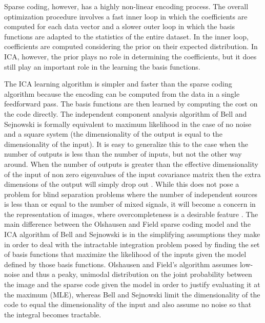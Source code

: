 Sparse coding, however, has a highly non-linear encoding process. The overall optimization procedure involves a fast inner loop in which the coefficients are computed for each data vector and a slower outer loop in which the basis functions are adapted to the statistics of the entire dataset. In the inner loop, coefficients are computed considering the prior on their expected distribution. In ICA, however, the prior plays no role in determining the coefficients, but it does still play an important role in the learning the basis functions.

The ICA learning algorithm is simpler and faster than the sparse coding algorithm because the encoding can be computed from the data in a single feedforward pass. The basis functions are then learned by computing the cost on the code directly. The independent component analysis algorithm of Bell and Sejnowski \citeyearpar{bell1997independent} is formally equivalent to maximum likelihood in the case of no noise and a square system (the dimensionality of the output is equal to the dimensionality of the input). It is easy to generalize this to the case when the number of outputs is less than the number of inputs, but not the other way around. When the number of outputs is greater than the effective dimensionality of the input of non zero eigenvalues of the input covariance matrix then the extra dimensions of the output will simply drop out \parencite{livezey2016degeneracy, le2011ica}. While this does not pose a problem for blind separation problems where the number of independent sources is less than or equal to the number of mixed signals, it will become a concern in the representation of images, where overcompleteness is a desirable feature \parencite{simoncelli1991shiftable}. The main difference between the Olshausen and Field \citeyearpar{olshausen1996emergence} sparse coding model and the ICA algorithm of Bell and Sejnowski \citeyearpar{bell1997independent} is in the simplifying assumptions they make in order to deal with the intractable integration problem posed by finding the set of basis functions that maximize the likelihood of the inputs given the model defined by those basis functions. Olshausen and Field’s algorithm assumes low-noise and thus a peaky, unimodal distribution on the joint probability between the image and the sparse code given the model in order to justify evaluating it at the maximum (MLE), whereas Bell and Sejnowski limit the dimensionality of the code to equal the dimensionality of the input and also assume no noise so that the integral becomes tractable.
